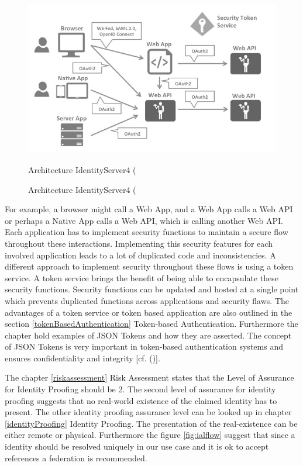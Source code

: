 \begin{figure}[h]
	\centering
	\includegraphics[width=0.9\linewidth]{images/architecture-identityserver}
	\caption[Architecture IdentityServer4]{Architecture IdentityServer4 (\cite{Brock:2018:ID4}}
	\caption{Architecture IdentityServer4 (\cite{Brock:2018:ID4}}
	\label{fig:architecture-identityserver}
\end{figure}



For example, a browser might call a Web App, and a Web App calls a Web API or perhaps a Native App calls a Web API, which is calling another Web API. Each application has to implement security functions to maintain a secure flow throughout these interactions. Implementing this security features for each involved application leads to a lot of duplicated code and inconsistencies. A different approach to implement security throughout these flows is using a token service. A token service brings the benefit of being able to encapsulate these security functions. Security functions can be updated and hosted at a single point which prevents duplicated functions across applications and security flaws. The advantages of a token service or token based application are also outlined in the section \ref{tokenBasedAuthentication} Token-based Authentication. Furthermore the chapter hold examples of JSON Tokens and how they are asserted. The concept of JSON Tokens is very important in token-based authentication systems and ensures confidentiality and integrity [cf. (\cite{Sakimura:2014:OpenIDConnect})].


The chapter \ref{riskassessment} Risk Assessment states that the Level of Assurance for Identity Proofing should be 2. The second level of assurance for identity proofing suggests that no real-world existence of the claimed identity has to present. The other identity proofing assurance level can be looked up in chapter \ref{identityProofing} Identity Proofing. The presentation of the real-existence can be either remote or physical. Furthermore the figure \ref{fig:ialflow} suggest that since a identity should be resolved uniquely in our use case and it is ok to accept references a federation is recommended.  



